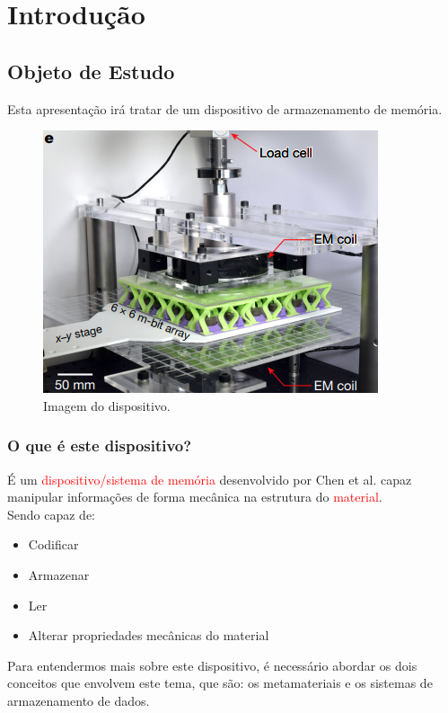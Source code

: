 \section{Introdução}

\subsection{Objeto de Estudo}
Esta apresentação irá tratar de um dispositivo de armazenamento de memória.

    \begin{figure}[H]
        \centering
        \includegraphics[scale = 0.5]{source/pictures/device.png}
        \caption{Imagem do dispositivo\cite{chen2021reprogrammable}.}
        \label{fig:device}
    \end{figure}

\subsubsection{O que é este dispositivo?}
    É um \textcolor{red}{dispositivo/sistema de memória} desenvolvido por Chen et al. capaz manipular informações de forma mecânica na estrutura do \textcolor{red}{material}\cite{coulais2021snappy}.\\ 

    Sendo capaz de:

    \begin{itemize}
        \item Codificar
        \item Armazenar
        \item Ler
        \item Alterar propriedades mecânicas do material
    \end{itemize}

    Para entendermos mais sobre este dispositivo, é necessário abordar os dois conceitos que envolvem este tema, que são: os metamateriais e os sistemas de armazenamento de dados. 

